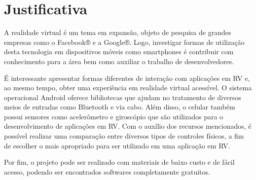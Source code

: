 \chapter{Justificativa}
\label{c.justificativa}

A realidade virtual é um tema em expansão, objeto de pesquisa de grandes empresas como o Facebook® e a Google®. Logo, investigar formas de utilização desta tecnologia em dispositivos móveis como smartphones é contribuir com conhecimento para a área bem como auxiliar o trabalho de desenvolvedores. 

É interessante apresentar formas diferentes de interação com aplicações em RV e, ao mesmo tempo, obter uma experiência em realidade virtual acessível. O sistema operacional Android oferece bibliotecas que ajudam no tratamento de diversos meios de entradas como Bluetooth e via cabo. Além disso, o celular também possui sensores como acelerômetro e giroscópio que são utilizados para o desenvolvimento de aplicações em RV. Com o auxílio dos recursos mencionados, é possível realizar uma comparação entre diversos tipos de controles físicos, a fim de escolher o mais apropriado para ser utilizado em uma aplicação em RV. 

Por fim, o projeto pode ser realizado com materiais de baixo custo e de fácil acesso, podendo ser encontrados softwares completamente gratuitos.





